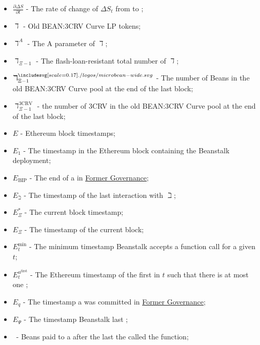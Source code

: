 \documentclass[class=article, crop=false]{standalone}
\begin{document}
\begin{itemize}[topsep=0pt, itemsep=3pt,leftmargin=16pt]
    \item[] $\frac{\partial \Delta S}{\partial t}$ - \hypertarget{ht63}{The rate of change of $\Delta S_t$ from  to };
    \item[] $\daleth$ - \hypertarget{ht64}{Old BEAN:3CRV Curve LP tokens};
    \item[] $\daleth^{A}$ - \hypertarget{ht65}{The A parameter of $\daleth$};
    \item[] $\daleth_{\Xi-1}$ - \hypertarget{ht66}{The flash-loan-resistant total number of $\daleth$};
    \item[] $\daleth_{\Xi-1}^{\bean}$ - \hypertarget{ht67}{The number of Beans in the old BEAN:3CRV Curve pool at the end of the last block};
    \item[] $\daleth_{\Xi-1}^{\text{3CRV}}$ - \hypertarget{ht68}{the number of 3CRV in the old BEAN:3CRV Curve pool at the end of the last block};
    \item[] $E$ - \hypertarget{ht69}{Ethereum block timestamps};
    \item[] $E_1$ - \hypertarget{ht70}{The timestamp in the Ethereum block containing the Beanstalk deployment};
    \item[] $E_{\text{BIP}}$ - \hypertarget{ht71}{The end of a   in \hyperlink{subsection.14.3}{Former Governance}};
    \item[] $E_{\beth}$ - \hypertarget{ht72}{The timestamp of the last interaction with $\beth$};
    \item[] $E_{\Xi}^*$ - \hypertarget{ht73}{The current block timestamp};
    \item[] $E_\Xi$ - The timestamp of the current block;
    \item[] $E_{t}^{\text{min}}$ - \hypertarget{ht75}{The minimum timestamp Beanstalk accepts a  function call for a given $t$};
    \item[] $E_{t}^{u^{\text{first}}}$ - \hypertarget{ht76}{The Ethereum timestamp of the first  in $t$ such that there is at most one };
    \item[] $E_q$ - \hypertarget{ht77}{The timestamp a  was committed in \hyperlink{subsection.14.3}{Former Governance}};
    \item[] $E_{\Psi}$ - \hypertarget{ht78}{The timestamp Beanstalk last };
    \item[]  \Bean\ - \hypertarget{ht79}{Beans paid to a  after the last  the  called the  function};

\end{itemize}
\end{document}
